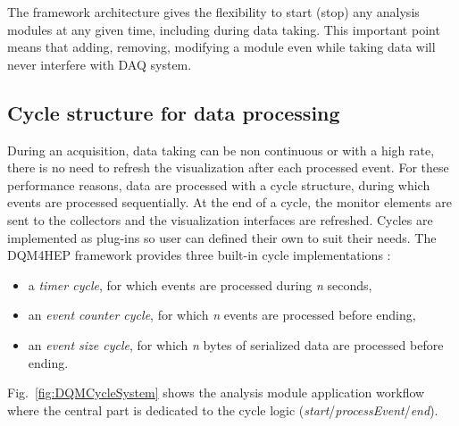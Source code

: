 \documentclass[conference]{IEEEtran}
\begin{document}
The framework architecture gives the flexibility to start (stop) any analysis modules at any given time, including during data taking. This important point means that adding, removing, modifying a module even while taking data will never interfere with DAQ system.

\subsection{Cycle structure for data processing}

During an acquisition, data taking can be non continuous or with a high rate, there is no need to refresh the visualization after each processed event. For these performance reasons, data are processed with a cycle structure, during which events are processed sequentially. At the end of a cycle, the monitor elements are sent to the collectors and the visualization interfaces are refreshed. Cycles are implemented as plug-ins so user can defined their own to suit their needs. The DQM4HEP framework provides three built-in cycle implementations :

\begin{itemize}
  \item a \textit{timer cycle}, for which events are processed during \textit{n} seconds,
  \item an \textit{event counter cycle}, for which \textit{n} events are processed before ending,
  \item an \textit{event size cycle}, for which \textit{n} bytes of serialized data are processed before ending.
\end{itemize}

Fig.~\ref{fig:DQMCycleSystem} shows the analysis module application workflow where the central part is dedicated to the cycle logic (\textit{start}/\textit{processEvent}/\textit{end}).
\end{document}
